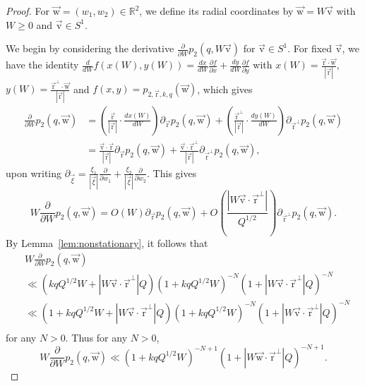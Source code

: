 \documentclass[letterpaper,11pt]{amsart}
\numberwithin{equation}{section}
\theoremstyle{definition}
\numberwithin{equation}{section}
\newcommand{\ur}{\vec{\mathrm{r}}}
\newcommand{\uw}{{\vec{\mathrm{w}}}}
\newcommand{\uv}{{\vec{\mathrm{v}}}}
\begin{document}
\begin{proof}
 For \(\uw=(w_1,w_2)\in \mathbb R^2\), we define its radial coordinates by \(\uw=W\uv\) with \(W\geq 0\) and \(\uv\in S^1\). 
 

We begin by considering  the derivative $\frac{\partial}{\partial W}p_{2}(q, W\uv)$ for $\uv \in S^1$.
For fixed \(\uv\), we have the identity \(\frac{d}{dW}f(x(W),y(W)) = \frac{dx}{dW} \frac{\partial f}{\partial x}+ \frac{dy}{dW} \frac{\partial f}{\partial y}\) with \(x(W) = \frac{\ur\cdot \uw}{|\ur|}\), \(y(W) = \frac{\ur^\perp\cdot \uw}{|\ur|}\) and \(f(x,y)=p_{2,\ur,k,q}(\uw)\), which gives
\begin{align*}
		\frac{\partial}{\partial W}
		p_2(q,\uw)
&=
\left(\frac{\ur}{|\ur|} \cdot \frac{d x(W)}{d W}\right)
 \partial_{\ur}p_2(q,\uw)
 +
 \left(\frac{\ur^\perp}{|\ur|}  \cdot\frac{d y(W)}{d W}\right)
 \partial_{\ur^\perp}p_2(q,\uw)
 \\
&=
\frac{\uv\cdot \ur}{|\ur|}	
 \partial_{\ur}p_2(q,\uw)
 +
\frac{\uv\cdot \ur^\perp}{|\ur|}	
 \partial_{\ur^\perp}p_2(q,\uw),
\end{align*}
 upon writing \(\partial_{\vec{\xi}} = \frac{\xi_1}{|\vec\xi|}\frac{\partial}{\partial w_1}+\frac{ \xi_2}{|\vec\xi|}\frac{\partial}{\partial w_2}\). 
 This gives $$
		W\frac{\partial}{\partial W}
		p_2(q,\uw) 
		=
		O(W)
		\partial_{\ur }
		p_2(q,\uw)
		+
		O\left(\frac{|W\uv \cdot \ur^\perp|}{Q^{1/2}}\right)
		\partial_{\ur ^\perp}
		p_2(q,\uw).
$$
 By Lemma~\ref{lem:nonstationary}, it follows that
 \begin{align*}
			&W\frac{\partial}{\partial W}
		p_2(q,\uw) \\&\ll (kqQ^{1/2}W+ {|W\uv \cdot \ur^\perp|} Q)(1+kqQ^{1/2}W)^{-N} (1+|W\uv \cdot \ur^\perp|Q)^{-N} \\
  &\ll (1+kqQ^{1/2}W+{|W\uv \cdot \ur^\perp|} Q)(1+kqQ^{1/2}W)^{-N} (1+|W\uv \cdot \ur^\perp|Q)^{-N} \\
	\end{align*}
 for any $N>0$. Thus for any $N>0$,
 \begin{equation}
     	\label{eq:nonstationary_radial}
		W\frac{\partial}{\partial W}
		p_2(q,\uw)\ll
		( 1+kqQ^{1/2}W )^{-N+1}(1+|W\uw\cdot \ur^\perp| Q)^{-N+1}.
 \end{equation}


\end{proof}
\end{document}
